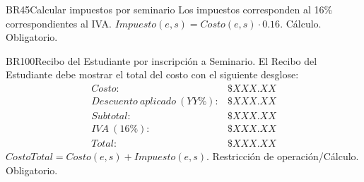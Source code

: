 \begin{BussinesRule}{BR45}{Calcular impuestos por seminario}
	\BRitem[Descripción:] Los impuestos corresponden al 16\% correspondientes al IVA.
	\BRitem[Sentencia:] $Impuesto(e, s) = Costo(e, s)\cdot0.16$.
	\BRitem[Tipo:] Cálculo.
	\BRitem[Nivel:] Obligatorio.
\end{BussinesRule}

\begin{BussinesRule}{BR100}{Recibo del Estudiante por inscripción a Seminario.}
	\BRitem[Descripción:] El  Recibo del Estudiante debe mostrar el total del costo con el siguiente desglose:
		\begin{displaymath}\begin{array}{lr}
			Costo: & \$ XXX.XX\\
			Descuento~aplicado~(YY\%): & \$ XXX.XX\\
			Subtotal: & \$ XXX.XX\\
			IVA~(16\%): & \$ XXX.XX\\\hline
			Total: & \$ XXX.XX
		\end{array}\end{displaymath}
	\BRitem[Sentencia:] $CostoTotal = Costo(e, s) + Impuesto(e, s)$.
	\BRitem[Tipo:] Restricción de operación/Cálculo.
	\BRitem[Nivel:] Obligatorio.
\end{BussinesRule}



